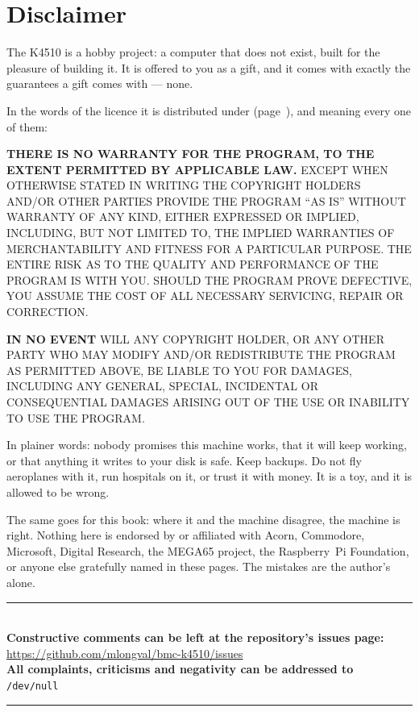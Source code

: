 \chapter{Disclaimer}\label{cha:disclaimer}

The K4510 is a hobby project: a computer that does not exist,
built for the pleasure of building it. It is offered to you as a gift,
and it comes with exactly the guarantees a gift comes with --- none.

In the words of the licence it is distributed under
(page~\pageref{cha:licences}), and meaning every one of them:

\begin{aside}
\footnotesize
\textbf{THERE IS NO WARRANTY FOR THE PROGRAM, TO THE EXTENT PERMITTED
BY APPLICABLE LAW.} EXCEPT WHEN OTHERWISE STATED IN WRITING THE
COPYRIGHT HOLDERS AND/OR OTHER PARTIES PROVIDE THE PROGRAM ``AS IS''
WITHOUT WARRANTY OF ANY KIND, EITHER EXPRESSED OR IMPLIED, INCLUDING,
BUT NOT LIMITED TO, THE IMPLIED WARRANTIES OF MERCHANTABILITY AND
FITNESS FOR A PARTICULAR PURPOSE. THE ENTIRE RISK AS TO THE QUALITY
AND PERFORMANCE OF THE PROGRAM IS WITH YOU. SHOULD THE PROGRAM PROVE
DEFECTIVE, YOU ASSUME THE COST OF ALL NECESSARY SERVICING, REPAIR OR
CORRECTION.

\textbf{IN NO EVENT} WILL ANY COPYRIGHT HOLDER, OR ANY OTHER PARTY WHO
MAY MODIFY AND/OR REDISTRIBUTE THE PROGRAM AS PERMITTED ABOVE, BE
LIABLE TO YOU FOR DAMAGES, INCLUDING ANY GENERAL, SPECIAL, INCIDENTAL
OR CONSEQUENTIAL DAMAGES ARISING OUT OF THE USE OR INABILITY TO USE
THE PROGRAM.
\end{aside}

In plainer words: nobody promises this machine works, that it will
keep working, or that anything it writes to your disk is safe. Keep
backups. Do not fly aeroplanes with it, run hospitals on it, or trust
it with money. It is a toy, and it is allowed to be wrong.

The same goes for this book: where it and the machine disagree, the
machine is right. Nothing here is endorsed by or affiliated with
Acorn, Commodore, Microsoft, Digital Research, the MEGA65 project, the
Raspberry~Pi Foundation, or anyone else gratefully named in these
pages. The mistakes are the author's alone.

\newpage
\vspace*{4cm}
\begin{center}
{\color{korange}\rule{0.5\linewidth}{0.8pt}}\\[6mm]
\textbf{Constructive comments can be left at the repository's issues
page:}\\
\url{https://github.com/mlongval/bmc-k4510/issues}\\[4mm]
\textbf{All complaints, criticisms and negativity can be addressed
to}\\
\texttt{/dev/null}\\[6mm]
{\color{korange}\rule{0.5\linewidth}{0.8pt}}
\end{center}

